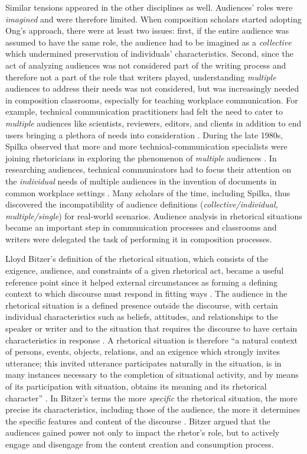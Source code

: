 Similar tensions appeared in the other disciplines as well. Audiences' roles were \textit{imagined} and were therefore limited. When composition scholars started adopting Ong’s approach, there were at least two issues: first, if the entire audience was assumed to have the same role, the audience had to be imagined as a \textit{collective} which undermined preservation of individuals’ characteristics. Second, since the act of analyzing audiences was not considered part of the writing process and therefore not a part of the role that writers played, understanding \textit{multiple} audiences to address their needs was not considered, but was increasingly needed in composition classrooms, especially for teaching workplace communication. For example, technical communication practitioners had felt the need to cater to \textit{multiple} audiences like scientists, reviewers, editors, and clients in addition to end users bringing a plethora of needs into consideration \cite{spilka1990orality}. During the late 1980s, Spilka observed that more and more technical-communication specialists were joining rhetoricians in exploring the phenomenon of \textit{multiple} audiences \cite{spilka1990orality}. In researching audiences, technical communicators had to focus their attention on the \textit{individual} needs of multiple audiences in the invention of documents in common workplace settings \cite{spilka1990orality}. Many scholars of the time, including Spilka, thus discovered the incompatibility of audience definitions (\textit{collective/individual, multiple/single}) for real-world scenarios. Audience analysis in rhetorical situations became an important step in communication processes and classrooms and writers were delegated the task of performing it in composition processes.

Lloyd Bitzer's definition of the rhetorical situation, which consists of the exigence, audience, and constraints of a given rhetorical act, became a useful reference point since it helped external circumstances as forming a defining context to which discourse must respond in fitting ways \cite{park1982meanings}. The audience in the rhetorical situation is a defined presence outside the discourse, with certain individual characteristics such as beliefs, attitudes, and relationships to the speaker or writer and to the situation that requires the discourse to have certain characteristics in response \cite{bitzer1968rhetorical}. A rhetorical situation is therefore “a natural context of persons, events, objects, relations, and an exigence which strongly invites utterance; this invited utterance participates naturally in the situation, is in many instances necessary to the completion of situational activity, and by means of its participation with situation, obtains its meaning and its rhetorical character” \cite{park1982meanings}. In Bitzer's terms the more \textit{specific} the rhetorical situation, the more precise its characteristics, including those of the audience, the more it determines the specific features and content of the discourse \cite{bitzer1968rhetorical}. Bitzer argued that the audiences gained power not only to impact the rhetor's role, but to actively engage and disengage from the content creation and consumption process.

